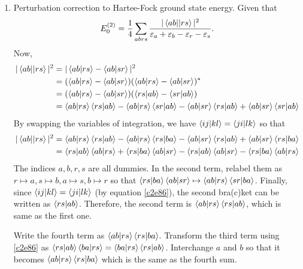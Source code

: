 \begin{enumerate}
\item\label{c2p18} Perturbation correction to Hartee-Fock ground state energy.
Given that
\[
E_0^{(2)} = \frac{1}{4}\sum_{abrs}\frac{|\braket{ab||rs}|^2}{\varepsilon_a +
\varepsilon_b - \varepsilon_r - \varepsilon_s}.
\]
Now,
\[
\begin{aligned}
|\braket{ab||rs}|^2 &= |\braket{ab|rs} - \braket{ab|sr}|^2 \\
&= (\braket{ab|rs} - \braket{ab|sr})(\braket{ab|rs} - \braket{ab|sr})^\ast \\
&= (\braket{ab|rs} - \braket{ab|sr})(\braket{rs|ab} - \braket{sr|ab}) \\
&= \braket{ab|rs}\braket{rs|ab} - \braket{ab|rs}\braket{sr|ab} - 
   \braket{ab|sr}\braket{rs|ab} + \braket{ab|sr}\braket{sr|ab}
\end{aligned}
\]
By swapping the variables of integration, we have $\braket{ij|kl}=\braket{ji|lk}$
so that
\[
\begin{aligned}
|\braket{ab||rs}|^2 &= \braket{ab|rs}\braket{rs|ab} - 
\braket{ab|rs}\braket{rs|ba} - \braket{ab|sr}\braket{rs|ab} + 
\braket{ab|sr}\braket{rs|ba} \\
 &= \braket{rs|ab}\braket{ab|rs} + \braket{rs|ba}\braket{ab|sr} -
 \braket{rs|ab}\braket{ab|sr} - \braket{rs|ba}\braket{ab|rs}
\end{aligned}
\]
The indices $a, b, r, s$ are all dummies. In the second term, relabel them as
$r \mapsto a, s \mapsto b, a \mapsto s, b \mapsto r$ so that 
$\braket{rs|ba}\braket{ab|sr} \mapsto \braket{ab|rs}\braket{sr|ba}$. Finally,
since $\braket{ij|kl} = \braket{ji|lk}$ (by equation \eqref{c2e86}), the second
bra(c)ket can be written as $\braket{rs|ab}$. Therefore, the second term is
$\braket{ab|rs}\braket{rs|ab}$, which is same as the first one.

Write the fourth term as $\braket{ab|rs}\braket{rs|ba}$. Transform the third
term using \eqref{c2e86} as $\braket{rs|ab}\braket{ba|rs} = \braket{ba|rs}
\braket{rs|ab}$. Interchange $a$ and $b$ so that it becomes $\braket{ab|rs}
\braket{rs|ba}$ which is the same as the fourth sum.


\end{enumerate}
